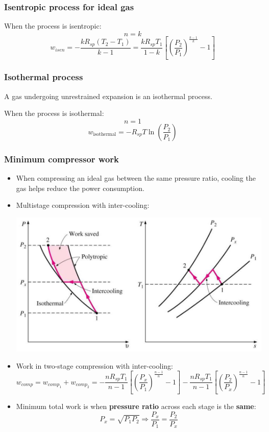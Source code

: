 \documentclass[11pt]{article}
\begin{document}
\subsubsection{Isentropic process for ideal gas}
\label{sec:orgca3eefc}
When the process is isentropic:
\[n = k\]
\[w_{isen} = - \frac{k R_{sp} (T_2 - T_1)}{k - 1} = \frac{k R_{sp} T_1}{1 - k} \left[\left(\frac{P_2}{P_1} \right)^{\frac{k - 1}{k}} - 1 \right]\]

\subsubsection{Isothermal process}
\label{sec:orgf17f289}
A gas undergoing unrestrained expansion is an isothermal process.

When the process is isothermal:
\[n = 1\]
\[w_{\text{isothermal}} = - R_{sp} T \ln \left(\frac{P_2}{P_1} \right)\]

\subsubsection{Minimum compressor work}
\label{sec:org09ce219}
\begin{itemize}
\item When compressing an ideal gas between the same pressure ratio, cooling the gas helps reduce the power consumption.
\item Multistage compression with inter-cooling:
\begin{center}
\includegraphics[width=.9\linewidth]{./images/multistage-compression-with-inter-cooling.png}
\end{center}
\item Work in two-stage compression with inter-cooling:
\[w_{comp} = w_{comp_1} + w_{comp_2} = - \frac{n R_{sp} T_1}{n - 1} \left[\left(\frac{P_x}{P_1} \right)^{\frac{n - 1}{n}} - 1 \right] - \frac{n R_{sp} T_1}{n - 1} \left[\left(\frac{P_2}{P_x} \right)^{\frac{n - 1}{n}} - 1 \right]\]
\item Minimum total work is when \textbf{pressure ratio} across each stage is the \textbf{same}:
\[P_x = \sqrt{P_1 P_2} \Rightarrow \frac{P_x}{P_1} = \frac{P_2}{P_x}\]
\end{itemize}
\end{document}
